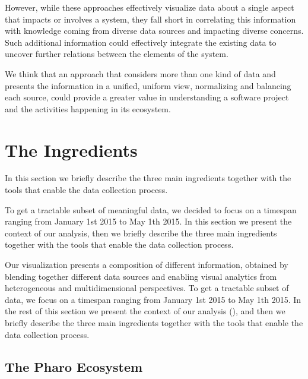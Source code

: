 However, while these approaches effectively visualize data about a single aspect that impacts or involves a system, they fall short in correlating this information with knowledge coming from diverse data sources and impacting diverse concerns.
Such additional information could effectively integrate the existing data to uncover further relations between the elements of the system.

We think that an approach that considers more than one kind of data and presents the information in a unified, uniform view, normalizing and balancing each source, could provide a greater value in understanding a software project and the activities happening in its ecosystem.



\section{The Ingredients}\label{sec:ingredients}

In this section we briefly describe the three main ingredients together with the tools that enable the data collection process.

To get a tractable subset of meaningful data, we decided to focus on a timespan ranging from January 1st 2015 to May 1th 2015.
In this section we present the context of our analysis, then we briefly describe the three main ingredients together with the tools that enable the data collection process.

Our visualization presents a composition of different information, obtained by blending together different data sources and enabling visual analytics from heterogeneous and multidimensional perspectives.
To get a tractable subset of data, we focus on a timespan ranging from January 1st 2015 to May 1th 2015.
In the rest of this section we present the context of our analysis (), and then we briefly describe the three main ingredients together with the tools that enable the data collection process.

\subsection{The Pharo Ecosystem} \label{sec:ingredients:pharo}

